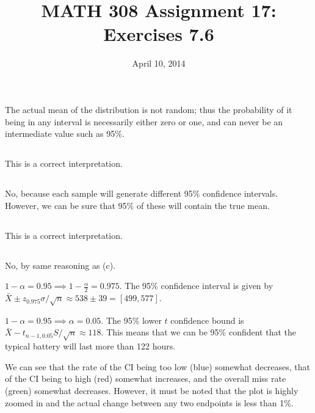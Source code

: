 \documentclass[twocolumn]{article}
\title{MATH 308 Assignment 17:\\Exercises 7.6}
\date{April 10, 2014}
\begin{document}
\maketitle

\subsection{}
The actual mean of the distribution is not random; thus the probability of it being in any interval is necessarily either zero or one, and can never be an intermediate value such as 95\%.
\subsection{}
This is a correct interpretation.
\subsection{}
No, because each sample will generate different 95\% confidence intervals. However, we can be sure that 95\% of these will contain the true mean.
\subsection{}
This is a correct interpretation.
\subsection{}
No, by same reasoning as (c).

$1-\alpha=0.95\implies 1-\frac{\alpha}{2}=0.975$. The 95\% confidence interval is given by $\bar{X}\pm z_{0.975}\sigma/\sqrt{n}\approx 538\pm 39=[499,577]$.

$1-\alpha=0.95\implies \alpha=0.05$. The 95\% lower $t$ confidence bound is $\bar X-t_{n-1,0.05}S/\sqrt{n}\approx 118$. This means that we can be 95\% confident that the typical battery will last more than 122 hours.


We can see that the rate of the CI being too low (blue) somewhat decreases, that of the CI being to high (red) somewhat increases, and the overall miss rate (green) somewhat decreases. However, it must be noted that the plot is highly zoomed in and the actual change between any two endpoints is less than 1\%.
\end{document}
